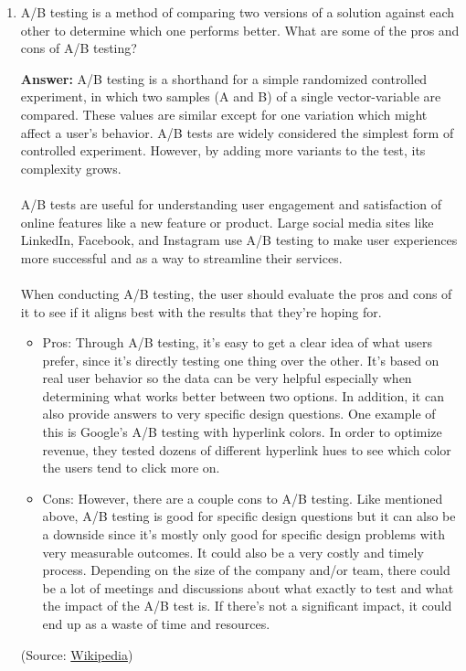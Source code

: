 \documentclass{article}
\newenvironment{QandA}{\begin{enumerate}[label=\arabic*.]}{\end{enumerate}}
\newenvironment{InnerQandA}{\begin{enumerate}[label=\roman*.]}{\end{enumerate}}
\newenvironment{answer}{\par\normalfont \textbf{Answer:}}{}
\begin{document}
\begin{QandA}
\begin{InnerQandA}
\begin{answer}
            (See more \href{https://stats.stackexchange.com/questions/73646/how-do-i-test-that-two-continuous-variables-are-independent}{here})
        \end{answer}
    \end{InnerQandA}

    \item A/B testing is a method of comparing two versions of a solution against each other to determine which one performs better. What are some of the pros and cons of A/B testing?
    \begin{answer}
        A/B testing is a shorthand for a simple randomized controlled experiment, in which two samples (A and B) of a single vector-variable are compared. These values are similar except for one variation which might affect a user's behavior. A/B tests are widely considered the simplest form of controlled experiment. However, by adding more variants to the test, its complexity grows. \\\\
        A/B tests are useful for understanding user engagement and satisfaction of online features like a new feature or product. Large social media sites like LinkedIn, Facebook, and Instagram use A/B testing to make user experiences more successful and as a way to streamline their services.\\\\
        When conducting A/B testing, the user should evaluate the pros and cons of it to see if it aligns best with the results that they’re hoping for.
        \begin{itemize}
            \item Pros: Through A/B testing, it’s easy to get a clear idea of what users prefer, since it’s directly testing one thing over the other. It’s based on real user behavior so the data can be very helpful especially when determining what works better between two options. In addition, it can also provide answers to very specific design questions. One example of this is Google's A/B testing with hyperlink colors. In order to optimize revenue, they tested dozens of different hyperlink hues to see which color the users tend to click more on.
            \item Cons: However, there are a couple cons to A/B testing. Like mentioned above, A/B testing is good for specific design questions but it can also be a downside since it’s mostly only good for specific design problems with very measurable outcomes. It could also be a very costly and timely process. Depending on the size of the company and/or team, there could be a lot of meetings and discussions about what exactly to test and what the impact of the A/B test is. If there’s not a significant impact, it could end up as a waste of time and resources.
        \end{itemize}
        (Source: \href{https://en.wikipedia.org/wiki/A/B_testing}{Wikipedia})
    \end{answer}


\end{QandA}
\end{document}
